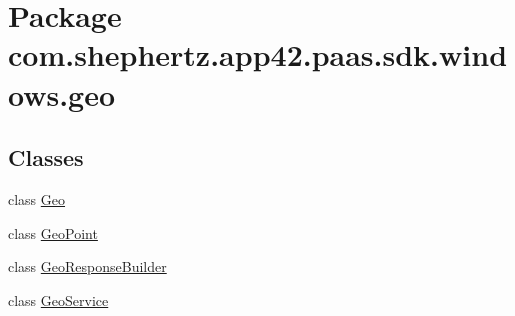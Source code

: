 \hypertarget{namespacecom_1_1shephertz_1_1app42_1_1paas_1_1sdk_1_1windows_1_1geo}{\section{Package com.\+shephertz.\+app42.\+paas.\+sdk.\+windows.\+geo}
\label{namespacecom_1_1shephertz_1_1app42_1_1paas_1_1sdk_1_1windows_1_1geo}
}
\subsection*{Classes}
\begin{DoxyCompactItemize}
\item 
class \hyperlink{classcom_1_1shephertz_1_1app42_1_1paas_1_1sdk_1_1windows_1_1geo_1_1_geo}{Geo}
\item 
class \hyperlink{classcom_1_1shephertz_1_1app42_1_1paas_1_1sdk_1_1windows_1_1geo_1_1_geo_point}{Geo\+Point}
\item 
class \hyperlink{classcom_1_1shephertz_1_1app42_1_1paas_1_1sdk_1_1windows_1_1geo_1_1_geo_response_builder}{Geo\+Response\+Builder}
\item 
class \hyperlink{classcom_1_1shephertz_1_1app42_1_1paas_1_1sdk_1_1windows_1_1geo_1_1_geo_service}{Geo\+Service}
\end{DoxyCompactItemize}
